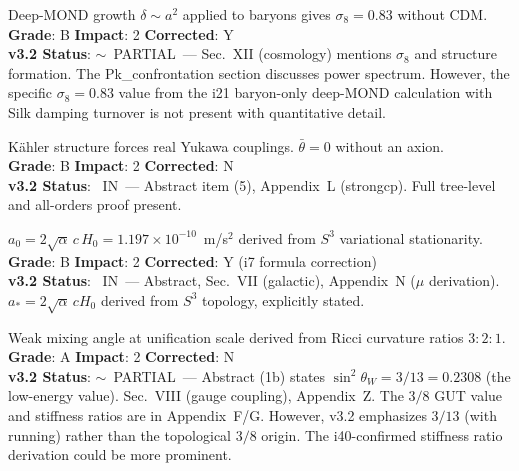 \documentclass[11pt,a4paper]{article}
\newcommand{\vin}{\textcolor{statusIN}{\checkmark~IN}}
\newcommand{\vpartial}{\textcolor{statusPARTIAL}{$\sim$~PARTIAL}}
\begin{document}
\begin{tcolorbox}[colback=major!5,colframe=major,title=\textbf{F11: $\sigma_8 = 0.83$ from Baryon-Only Growth}]
Deep-MOND growth $\delta \sim a^2$ applied to baryons gives $\sigma_8 = 0.83$ without CDM.\\
\textbf{Grade}: B \quad \textbf{Impact}: 2 \quad \textbf{Corrected}: Y\\
\textbf{v3.2 Status}: \vpartial\ --- Sec.~XII (cosmology) mentions $\sigma_8$ and structure formation. The Pk\_confrontation section discusses power spectrum. However, the specific $\sigma_8 = 0.83$ value from the i21 baryon-only deep-MOND calculation with Silk damping turnover is not present with quantitative detail.
\end{tcolorbox}

\begin{tcolorbox}[colback=major!5,colframe=major,title=\textbf{F12: Strong CP Solution: $\bar{\theta} = 0$ from $\mathbb{C}P^2 \times S^3$ Geometry}]
K\"ahler structure forces real Yukawa couplings. $\bar{\theta} = 0$ without an axion.\\
\textbf{Grade}: B \quad \textbf{Impact}: 2 \quad \textbf{Corrected}: N\\
\textbf{v3.2 Status}: \vin\ --- Abstract item (5), Appendix~L (strongcp). Full tree-level and all-orders proof present.
\end{tcolorbox}

\begin{tcolorbox}[colback=major!5,colframe=major,title=\textbf{F13: MOND Acceleration Scale as Topological Quantity}]
$a_0 = 2\sqrt{\alpha}\,c\,H_0 = 1.197 \times 10^{-10}$~m/s$^2$ derived from $S^3$ variational stationarity.\\
\textbf{Grade}: B \quad \textbf{Impact}: 2 \quad \textbf{Corrected}: Y (i7 formula correction)\\
\textbf{v3.2 Status}: \vin\ --- Abstract, Sec.~VII (galactic), Appendix~N ($\mu$ derivation). $a_* = 2\sqrt{\alpha}\,cH_0$ derived from $S^3$ topology, explicitly stated.
\end{tcolorbox}

\begin{tcolorbox}[colback=major!5,colframe=major,title=\textbf{F14: $\sin^2\theta_W^0 = 3/8$ and Gauge Coupling Unification}]
Weak mixing angle at unification scale derived from Ricci curvature ratios $3:2:1$.\\
\textbf{Grade}: A \quad \textbf{Impact}: 2 \quad \textbf{Corrected}: N\\
\textbf{v3.2 Status}: \vpartial\ --- Abstract (1b) states $\sin^2\theta_W = 3/13 = 0.2308$ (the low-energy value). Sec.~VIII (gauge coupling), Appendix~Z. The $3/8$ GUT value and stiffness ratios are in Appendix~F/G. However, v3.2 emphasizes $3/13$ (with running) rather than the topological $3/8$ origin. The i40-confirmed stiffness ratio derivation could be more prominent.
\end{tcolorbox}
\end{document}
